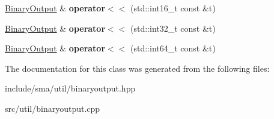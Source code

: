 \begin{DoxyCompactItemize}
\item 
\hypertarget{classsma_1_1BinaryOutput_aeca8e6ebc97eb10a939b2e07e13bc635}{\hyperlink{classsma_1_1BinaryOutput}{Binary\-Output} \& {\bfseries operator$<$$<$} (std\-::int16\-\_\-t const \&t)}\label{classsma_1_1BinaryOutput_aeca8e6ebc97eb10a939b2e07e13bc635}

\item 
\hypertarget{classsma_1_1BinaryOutput_a15402d755d1fefa3ed45082fb8eb083b}{\hyperlink{classsma_1_1BinaryOutput}{Binary\-Output} \& {\bfseries operator$<$$<$} (std\-::int32\-\_\-t const \&t)}\label{classsma_1_1BinaryOutput_a15402d755d1fefa3ed45082fb8eb083b}

\item 
\hypertarget{classsma_1_1BinaryOutput_a50c528384783c433e2f04c6337278972}{\hyperlink{classsma_1_1BinaryOutput}{Binary\-Output} \& {\bfseries operator$<$$<$} (std\-::int64\-\_\-t const \&t)}\label{classsma_1_1BinaryOutput_a50c528384783c433e2f04c6337278972}

\end{DoxyCompactItemize}


The documentation for this class was generated from the following files\-:\begin{DoxyCompactItemize}
\item 
include/sma/util/binaryoutput.\-hpp\item 
src/util/binaryoutput.\-cpp\end{DoxyCompactItemize}
